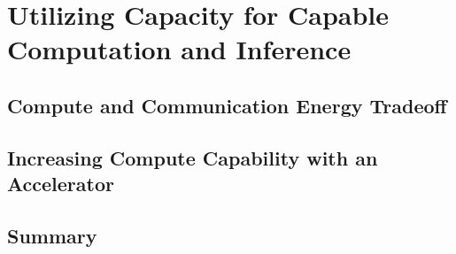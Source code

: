 \chapter{Utilizing Capacity for Capable Computation and Inference}
\label{cha:capability}

\section{Compute and Communication Energy Tradeoff}

\section{Increasing Compute Capability with an Accelerator}

\section{Summary}
